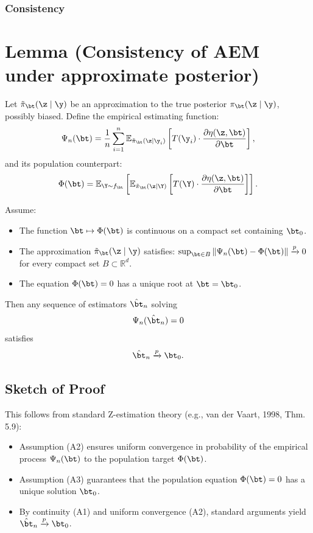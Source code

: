 \subsubsection{Consistency}

\section*{Lemma (Consistency of AEM under approximate posterior)}

Let \( \tilde{\pi}_\bt(\z \mid \y) \) be an approximation to the true posterior \( \pi_\bt(\z \mid \y) \), possibly biased. Define the empirical estimating function:
\begin{equation}
\label{eq:AEM-estimating-equation}
\Psi_n(\bt) 
= \frac{1}{n} \sum_{i=1}^n 
\mathbb{E}_{\tilde\pi_\bt(\z \mid \y_i)} 
\left[
T(\y_i) \cdot 
\frac{\partial \eta(\z, \bt)}{\partial \bt}
\right],
\end{equation}
and its population counterpart:
\begin{equation}
\label{eq:AEM-population-target}
\Phi(\bt)
= \mathbb{E}_{\Y \sim f_\bt}
\left[
\mathbb{E}_{\tilde\pi_\bt(\z \mid \Y)} 
\left[
T(\Y) \cdot 
\frac{\partial \eta(\z, \bt)}{\partial \bt}
\right]
\right].
\end{equation}

Assume:
\begin{itemize}
    \item[(A1)] The function \( \bt \mapsto \Phi(\bt) \) is continuous on a compact set containing \( \bt_0 \).
    \item[(A2)] The approximation \( \tilde{\pi}_\bt(\z \mid \y) \) satisfies: \( \sup_{\bt \in B} \| \Psi_n(\bt) - \Phi(\bt) \| \xrightarrow{p} 0 \) for every compact set \( B \subset \mathbb{R}^d \).
    \item[(A3)] The equation \( \Phi(\bt) = 0 \) has a unique root at \( \bt = \bt_0 \).
\end{itemize}

Then any sequence of estimators \( \hat\bt_n \) solving
\[
\Psi_n(\hat\bt_n) = 0
\]
satisfies
\[
\hat\bt_n \xrightarrow{p} \bt_0.
\]

\subsection*{Sketch of Proof}

This follows from standard Z-estimation theory (e.g., van der Vaart, 1998, Thm. 5.9):

\begin{itemize}
    \item Assumption (A2) ensures uniform convergence in probability of the empirical process \( \Psi_n(\bt) \) to the population target \( \Phi(\bt) \).
    \item Assumption (A3) guarantees that the population equation \( \Phi(\bt) = 0 \) has a unique solution \( \bt_0 \).
    \item By continuity (A1) and uniform convergence (A2), standard arguments yield \( \hat\bt_n \xrightarrow{p} \bt_0 \).
\end{itemize}


